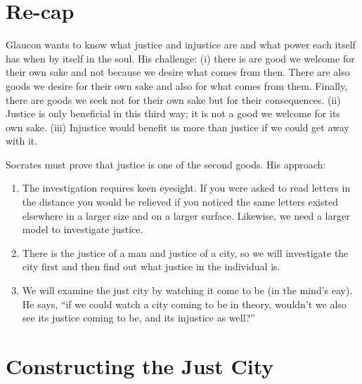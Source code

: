 \documentclass[oneside]{article}
\begin{document}
\thispagestyle{fancy}

\section*{Re-cap}

Glaucon wants to know what justice and injustice are and what power each itself has when by itself in the soul. His challenge: (i) there is are good we welcome for their own sake and not because we desire what comes from then. There are also goods we desire for their own sake and also for what comes from them. Finally, there are goods we seek not for their own sake but for their consequences. (ii) Justice is only beneficial in this third way; it is not a good we welcome for its own sake. (iii)  Injustice would benefit us more than justice if we could get away with it. 

Socrates must prove that justice is one of the second goods. His approach: 

\begin{enumerate}
\item The investigation requires keen eyesight. If you were asked to read letters in the distance you would be relieved if you noticed the same letters existed elsewhere in a larger size and on a larger surface. Likewise, we need a larger model to investigate justice. 
\item There is the justice of a man and justice of a city, so we will investigate the city first and then find out what justice in the individual is. 
\item We will examine the just city by watching it come to be (in the mind's eay). He says, ``if we could watch a city coming to be in theory, wouldn't we also see its justice coming to be, and its injustice as well?''
\end{enumerate}

\section*{Constructing the Just City}
\end{document}
